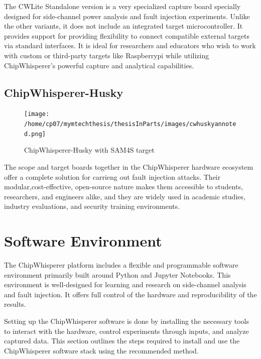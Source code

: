 The CWLite Standalone version is a very specialized capture board specially designed for side-channel power analysis and fault injection experiments. Unlike the other variants, it does not include an integrated target microcontroller. It provides support for providing flexibility to connect compatible external targets via standard interfaces. It is ideal for researchers and educators who wish to work with custom or third-party targets like Raspberrypi while utilizing ChipWhisperer's powerful capture and analytical capabilities.


\subsection{ChipWhisperer-Husky}
\begin{figure}[h]
    \centering
    \texttt{[image: /home/cp07/mymtechthesis/thesisInParts/images/cwhuskyannoted.png]}
    \caption{ChipWhisperer-Husky with SAM4S target}
    \label{fig:husky_target}
\end{figure}
The scope and target boards together in the ChipWhisperer hardware ecosystem offer a complete solution for carrieng out fault injection attacks. Their modular,cost-effective, open-source nature makes them accessible to students, researchers, and engineers alike, and they are widely used in academic studies, industry evaluations, and security training environments.

\section{Software Environment}
The ChipWhisperer platform includes a flexible and programmable software environment primarily built around Python and Jupyter Notebooks. This environment is well-designed for learning and research on side-channel analysis and fault injection. It offers full control of the hardware and reproducibility of the results. 

 Setting up the ChipWhisperer software is done by installing the necessary tools to interact with the hardware, control experiments through inputs, and analyze captured data. This section outlines the steps required to install and use the ChipWhisperer software stack using the recommended method.
